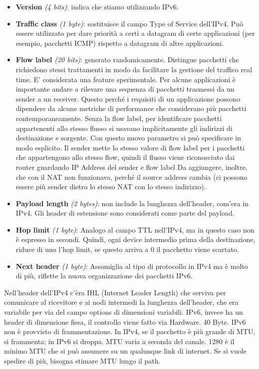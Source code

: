 \documentclass{article}
\begin{document}
\begin{itemize}
    \item \textbf{Version} \textit{(4 bits)}: indica che stiamo utilizzando IPv6.
    \item \textbf{Traffic class} \textit{(1 byte)}: sostituisce il campo Type of Service dell’IPv4. Può essere utilizzato per dare priorità a certi a datagram di certe applicazioni (per esempio, pacchetti ICMP) rispetto a datagram di altre applicazioni.
    \item \textbf{Flow label} \textit{(20 bits)}: generato randomicamente. Distingue pacchetti che richiedono stessi trattamenti in modo da facilitare la gestione del traffico real time. E’ considerata una feature sperimentale. Per alcune applicazioni è importante andare a rilevare una sequenza di pacchetti trasmessi da un sender a un receiver. Questo perché i requisiti di un applicazione possono dipendere da alcune metriche di performance che considerano più pacchetti contemporaneamente. Senza la flow label, per identificare pacchetti appartenenti allo stesso flusso si usavano implicitamente gli indirizzi di destinazione e sorgente. Con questo nuovo parametro si può specificare in modo esplicito. Il sender mette lo stesso valore di flow label per i pacchetti che appartengono allo stesso flow, quindi il flusso viene riconosciuto dai router guardando IP Address del sender e flow label Da aggiungere, inoltre, che con il NAT non funzionava, perché il source address cambia (ci possono essere più sender dietro lo stesso NAT con lo stesso indirizzo).
    \item \textbf{Payload length} \textit{(2 bytes)}: non include la lunghezza dell’header, com’era in IPv4. Gli header di estensione sono considerati come parte del payload.
    \item \textbf{Hop limit} \textit{(1 byte)}: Analogo al campo TTL nell’IPv4, ma in questo caso non è espresso in secondi. Quindi, ogni device intermedio prima della destinazione, riduce di uno l’hop limit, se questo arriva a 0 il pacchetto viene scartato.
    \item \textbf{Next header} \textit{(1 byte)}: Assomiglia al tipo di protocollo in IPv4 ma è molto di più, riflette la nuova organizzazione dei pacchetti IPv6.
\end{itemize}

Nell’header dell’IPv4 c’èra IHL (Internet Leader Length) che serviva per comunicare al ricevitore e ai nodi intermedi la lunghezza dell’header, che era variabile per via del campo options di dimensioni variabili.
IPv6, invece ha un header di dimensione fissa, il controllo viene fatto via Hardware. 40 Byte.
IPv6 non è provvisto di frammentazione. In IPv4, se il pacchetto è più grande di MTU, si frammenta; in IPv6 si droppa.
MTU varia a seconda del canale. 1280 è il minimo MTU che si può assumere su un qualunque link di internet. Se si vuole spedire di più, bisogna stimare MTU lungo il path. 
\end{document}
